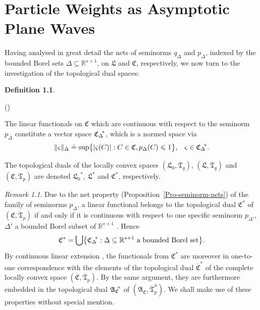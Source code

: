 \documentclass[11pt,twoside,openright]{report}
\theoremstyle{definition}
\newtheorem{Def}{Definition}[chapter]
\theoremstyle{plain}
\theoremstyle{remark}
\newtheorem*{Rem}{Remark}
\theoremstyle{assumption}
\newcommand{\bset}[1]{\bigl\{ #1 \bigr\}}
\newcommand{\abs}[1]{\lvert #1 \rvert}
\newcommand{\norm}[1]{\lVert #1 \rVert}
\newcommand{\pD}{p_\Delta}
\newcommand{\pDx}[1]{p_\Delta ( #1 )}
\newcommand{\pDprime}{p_{\Delta'}}
\newcommand{\qD}{q_\Delta}
\newcommand{\Cfrak}{\mathfrak{C}}
\newcommand{\Lfrak}{\mathfrak{L}}
\newcommand{\Tfrak}{\mathfrak{T}}
\newcommand{\Rsone}{\mathbb{R}^{s + 1}}
\newcommand{\Cfrakbar}{\overline{\mathfrak{C}}}
\newcommand{\Tfrakbar}{\overline{\mathfrak{T}}}
\newcommand{\AC}{\mathfrak{A}_\mathfrak{C}}
\newcommand{\ACstar}{{\mathfrak{A}_\mathfrak{C}}^{\negthickspace *}}
\newcommand{\Cstar}{\mathfrak{C}^*}
\newcommand{\Cbarstar}{\overline{\mathfrak{C}}^*}
\newcommand{\CDstar}{{\mathfrak{C}_\Delta}^{\negthickspace *}}
\newcommand{\Lstar}{\mathfrak{L}^*}
\newcommand{\Lzerostar}{{\mathfrak{L}_0}^*}
\newcounter{defitem}
\newenvironment{deflist}{\begin{list}{(\alph{defitem})}%
  {\usecounter{defitem} \setlength{\topsep}{0ex}%
   \setlength{\parsep}{0.2ex} \setlength{\itemsep}{0.4ex}%
   \setlength{\leftmargin}{0em} \setlength{\itemindent}{0.5em}%
   }}{\end{list}}
\begin{document}
\chapter{Particle Weights as Asymptotic Plane Waves}
  \label{chap-particle-weights}


Having analysed in great detail the nets of seminorms $\qD$ and $\pD$,
indexed by the bounded Borel sets $\Delta \subseteq \Rsone$, on
$\Lfrak$ and $\Cfrak$, respectively, we now turn to the investigation
of the topological dual spaces:
\begin{Def}
  \label{Def-varsigma-continuity}
  \begin{deflist}
  \item The linear functionals on $\Cfrak$ which are continuous with
    respect to the seminorm $\pD$ constitute a vector space $\CDstar$,
    which is a normed space via
    \begin{equation*}
      \norm{\varsigma}_\Delta \doteq \sup \bset{\abs{\varsigma ( C )}
      : C \in \Cfrak, \pDx{C} \leqslant 1} \text{,} \quad \varsigma
      \in \CDstar \text{.}
    \end{equation*}
  \item The topological duals of the locally convex spaces $( \Lfrak_0
    , \Tfrak_q )$, $( \Lfrak , \Tfrak_q )$ and $( \Cfrak , \Tfrak_p)$
    are denoted $\Lzerostar$, $\Lstar$ and $\Cstar$, respectively.
  \end{deflist}
\end{Def}
\begin{Rem}
  Due to the net property (Proposition~\ref{Pro-seminorm-nets}) of the
  family of seminorms $\pD$, a linear functional belongs to the
  topological dual $\Cstar$ of $( \Cfrak , \Tfrak_p )$ if and only if
  it is continuous with respect to one specific seminorm $\pDprime$,
  $\Delta'$ a bounded Borel subset of $\Rsone$
  \cite[Proposition~1.2.8]{kadison/ringrose:1983}. Hence
  \begin{equation}
    \label{eq-Cstar-CDstar-relation}
    \Cstar = \bigcup \bset{\CDstar : \Delta \subseteq \Rsone \text{~a
    bounded Borel set}} \text{.}
  \end{equation}
  By continuous linear extension \cite[Chapter~One,
  \S\,5,\,4.(4)]{koethe:1983}, the functionals from $\Cstar$ are
  moreover in one-to-one correspondence with the elements of the
  topological dual $\Cbarstar$ of the complete locally convex space $(
  \Cfrakbar , \Tfrakbar_p )$. By the same argument, they are
  furthermore embedded in the topological dual $\ACstar$ of $( \AC ,
  \Tfrakbar^u_p )$. We shall make use of these properties without
  special mention.
\end{Rem}
\end{document}
